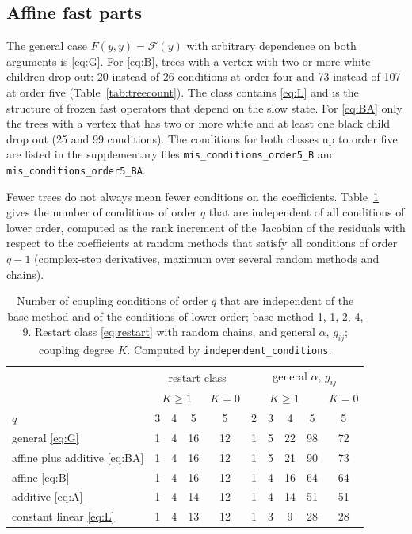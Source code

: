 \documentclass[11pt,a4paper]{article}
\theoremstyle{definition}
\theoremstyle{remark}
\begin{document}
\subsection{Affine fast parts}
\label{sec:special}

The general case $F(y,y)=\mathcal F(y)$ with arbitrary dependence on both arguments is \eqref{eq:G}. For \eqref{eq:B},
trees with a vertex with two or more white children drop out: 20 instead of 26 conditions at order four and 73 instead
of 107 at order five (Table~\ref{tab:treecount}). The class contains \eqref{eq:L} and is the structure of frozen fast
operators that depend on the slow state. For \eqref{eq:BA} only the trees with a vertex that has two or more white and
at least one black child drop out (25 and 99 conditions). The conditions for both classes up to order five are listed
in the supplementary files \texttt{mis\_conditions\_order5\_B} and \texttt{mis\_conditions\_order5\_BA}.

Fewer trees do not always mean fewer conditions on the coefficients. Table~\ref{tab:indep} gives the number of
conditions of order $q$ that are independent of all conditions of lower order, computed as the rank increment of the
Jacobian of the residuals with respect to the coefficients at random methods that satisfy all conditions of order
$q-1$ (complex-step derivatives, maximum over several random methods and chains).

\begin{table}[ht]
\centering
\caption{Number of coupling conditions of order $q$ that are independent of the base method and of the conditions of
lower order; base method 1, 1, 2, 4, 9. Restart class \eqref{eq:restart} with random chains, and general $\alpha$,
$g_{ij}$; coupling degree $K$. Computed by \texttt{independent\_conditions}.}
\label{tab:indep}
\begin{tabular}{l|ccc|c|cccc|c}
\toprule
 & \multicolumn{4}{c|}{restart class} & \multicolumn{5}{c}{general $\alpha$, $g_{ij}$}\\
 & \multicolumn{3}{c|}{$K\ge1$} & $K=0$ & \multicolumn{4}{c|}{$K\ge1$} & $K=0$\\
$q$ & 3 & 4 & 5 & 5 & 2 & 3 & 4 & 5 & 5\\\midrule
general \eqref{eq:G} & 1 & 4 & 16 & 12 & 1 & 5 & 22 & 98 & 72\\
affine plus additive \eqref{eq:BA} & 1 & 4 & 16 & 12 & 1 & 5 & 21 & 90 & 73\\
affine \eqref{eq:B} & 1 & 4 & 16 & 12 & 1 & 4 & 16 & 64 & 64\\
additive \eqref{eq:A} & 1 & 4 & 14 & 12 & 1 & 4 & 14 & 51 & 51\\
constant linear \eqref{eq:L} & 1 & 4 & 13 & 12 & 1 & 3 & 9 & 28 & 28\\
\bottomrule
\end{tabular}
\end{table}
\end{document}
